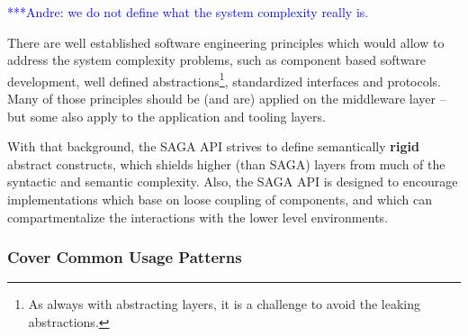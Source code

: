\documentclass[a4paper,12pt]{article}
\newcommand{\amnote}[1]{   {\textcolor{blue} { ***Andre:    #1 }}}
\newcommand{\amnote}[1]{}
\newcommand{\B}[1]{\textbf{#1}}
\begin{document}
    \amnote{we do not define what the system complexity really is.}

    There are well established software engineering principles which
    would allow to address the system complexity problems, such as
    component based software development, well defined
    abstractions\footnote{As always with abstracting layers, it is a
    challenge to avoid the leaking abstractions.}, standardized
    interfaces and protocols.  Many of those principles should be (and
    are) applied on the middleware layer -- but some also apply to the
    application and tooling layers.  

    With that background, the SAGA API strives to define semantically
    \B{rigid} abstract constructs, which shields higher (than SAGA)
    layers from much of the syntactic and semantic complexity.  Also,
    the SAGA API is designed to encourage implementations which base
    on loose coupling of components, and which can compartmentalize
    the interactions with the lower level environments.


   \subsubsection*{Cover Common Usage Patterns}
    







\end{document}
